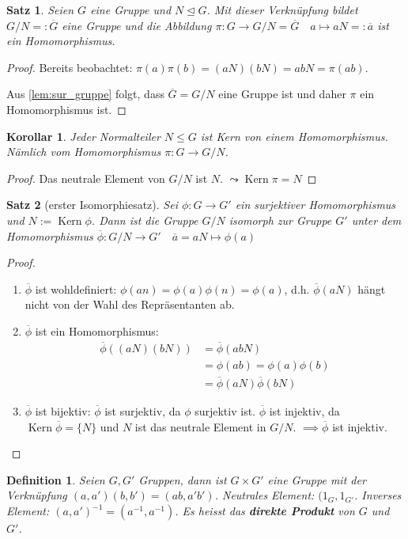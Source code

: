 \documentclass{article}
\theoremstyle{plain}
\newtheorem{definition}{Definition}
\newtheorem{theorem}{Satz}
\newtheorem{corollary}{Korollar}
\renewcommand{\ker}{\mathop{\text{Kern}}}
\newcommand{\defn}[1]{\textbf{#1}}
\newcommand{\ug}{\leq}
\newcommand{\normal}{\trianglelefteq}
\begin{document}
\begin{theorem}
    Seien $G$ eine Gruppe und $N\normal G$.
    Mit dieser Verknüpfung bildet $G/N =:\overline G$ eine Gruppe und die Abbildung $\pi\colon G\to G/N=\overline G \quad a\mapsto aN=: \overline a$ ist ein Homomorphismus.
\end{theorem}
\begin{proof}
    Bereits beobachtet: $\pi(a)\pi(b)=(aN)(bN)=abN=\pi(ab)$.

    Aus \cref{lem:sur_gruppe} folgt, dass $\overline G=G/N$ eine Gruppe ist und daher $\pi$ ein Homomorphismus ist.
\end{proof}

\begin{corollary}
    Jeder Normalteiler $N\ug G$ ist Kern von einem Homomorphismus. Nämlich vom Homomorphismus $\pi\colon G\to G/N$.
\end{corollary}
\begin{proof}
    Das neutrale Element von $G/N$ ist $N$. $\leadsto\ker \pi=N$
\end{proof}
\begin{theorem}[erster Isomorphiesatz]
    Sei $\phi\colon G\to G'$ ein surjektiver Homomorphismus und $N:=\ker\phi$. Dann ist die Gruppe $G/N$ isomorph zur Gruppe $G'$ unter dem Homomorphismus $\overline\phi\colon G/N\to G'\quad \overline a=aN\mapsto\phi(a)$
\end{theorem}
\begin{proof}
    \begin{enumerate}
        \item $\overline\phi$ ist wohldefiniert: $\phi(an)=\phi(a)\phi(n)=\phi(a)$, d.h. $\overline\phi(aN)$ hängt nicht von der Wahl des Repräsentanten ab.
        \item $\overline\phi$ ist ein Homomorphismus: 
        \begin{align*}
            \overline\phi((aN)(bN))&=\overline\phi(abN)\\
            &=\phi(ab)=\phi(a)\phi(b)\\
            &=\overline\phi(aN)\overline\phi(bN)
        \end{align*}
        \item $\overline\phi$ ist bijektiv: $\overline\phi$ ist surjektiv, da $\phi$ surjektiv ist. $\overline\phi$ ist injektiv, da $\ker\overline\phi=\{N\}$ und $N$ ist das neutrale Element in $G/N$. $\implies\overline\phi$ ist injektiv.
    \end{enumerate}
\end{proof}
\begin{definition}
    Seien $G,G'$ Gruppen, dann ist $G\times G'$ eine Gruppe mit der Verknüpfung $(a,a')(b,b')=(ab,a'b')$.
    Neutrales Element: $(1_G,1_{G'}$.
    Inverses Element: $(a,a')^{-1}=(a^{-1},a^{-1})$.
    Es heisst das \defn{direkte Produkt} von $G$ und $G'$.
\end{definition}
\end{document}
